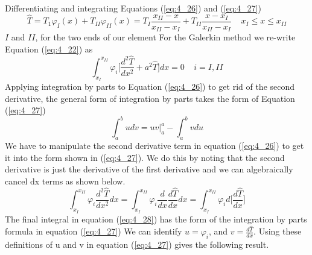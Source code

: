 \documentclass[12pt]{report}
\newcommand{\refn}[1]{(\ref{#1})}
\newcommand{\refx}[1]{\refn{eq:#1}}
\newcommand{\NI}{\noindent}
\newcommand{\dsp}{\displaystyle}
\begin{document}
	\NI Differentiating and integrating Equations \refx{4_26} and \refx{4_27}
	\begin{equation*}
		\hat{T} = T_1\varphi_I(x) + T_{II}\varphi_{II}(x) = T_I \frac{x_{II}-x}{x_{II} - x_I} + T_{II}\frac{x-x_{I}}{x_{II} - x_I} ~~~~~ x_I \leq x \leq x_{II}
	\end{equation*}
	$I$ and $II$, for the two ends of our element
	For the Galerkin method we re-write Equation \refx{4_22} as
	\begin{equation}
		\int_{x_I}^{x_{II}}\varphi_i\Biggl[\frac{d^2\hat{T}}{dx^2}+ a^2\hat{T}\Biggr]dx = 0 ~~~~~ i=I, II \label{eq:4_26}
	\end{equation}
	Applying integration by parts to Equation \refx{4_26} to get rid of the second derivative, the general form of integration by parts takes the form of Equation \refx{4_27}
	\begin{equation}
		\int_a^budv = uv\Biggl|_a^a - \int_a^bvdu \label{eq:4_27}
	\end{equation}
	We have to manipulate the second derivative term in equation \refx{4_26} to get it into the form shown in \refx{4_27}. We do this by noting that the second derivative is just the derivative of the first derivative and we can algebraically cancel dx terms as shown below.
	\begin{equation}
		\int_{x_{I}}^{x_{II}} \varphi_i\frac{d^2\hat{T}}{dx^2}dx = \int_{x_{I}}^{x_{II}}\varphi_i \frac{d}{dx}\frac{d\hat{T}}{dx} dx = \int_{x_{I}}^{x_{II}}\varphi_i d\Biggl[\frac{d\hat{T}}{dx}\Biggr]\label{eq:4_28}
	\end{equation}
	The final integral in equation \refx{4_28} has the form of the integration by parts formula in equation \refx{4_27} We can identify $u=\varphi_i$, and $v=\dsp \frac{d\hat{T}}{dx}$. Using these definitions of u and v in equation \refx{4_27} gives the following result.
	
\end{document}
